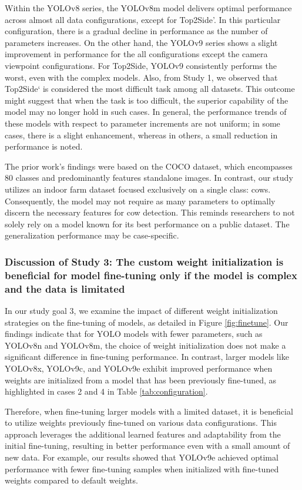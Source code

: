 Within the YOLOv8 series, the YOLOv8m model delivers optimal performance across almost all data configurations, except for Top2Side'. In this particular configuration, there is a gradual decline in performance as the number of parameters increases. On the other hand, the YOLOv9 series shows a slight improvement in performance for the all configurations except the camera viewpoint configurations. For Top2Side, YOLOv9 consistently performs the worst, even with the complex models. Also, from Study 1, we observed that Top2Side` is considered the most difficult task among all datasets. This outcome might suggest that when the task is too difficult, the superior capability of the model may no longer hold in such cases. In general, the performance trends of these models with respect to parameter increments are not uniform; in some cases, there is a slight enhancement, whereas in others, a small reduction in performance is noted.

The prior work's findings were based on the COCO dataset, which encompasses 80 classes and predominantly features standalone images. In contrast, our study utilizes an indoor farm dataset focused exclusively on a single class: cows. Consequently, the model may not require as many parameters to optimally discern the necessary features for cow detection. This reminds researchers to not solely rely on a model known for its best performance on a public dataset. The generalization performance may be case-specific.


\subsubsection*{Discussion of Study 3: The custom weight initialization is beneficial for model fine-tuning only if the  model is complex and the data is limitated}

In our study goal 3, we examine the impact of different weight initialization strategies on the fine-tuning of models, as detailed in Figure \ref{fig:finetune}. Our findings indicate that for YOLO models with fewer parameters, such as YOLOv8n and YOLOv8m, the choice of weight initialization does not make a significant difference in fine-tuning performance. In contrast, larger models like YOLOv8x, YOLOv9c, and YOLOv9e exhibit improved performance when weights are initialized from a model that has been previously fine-tuned, as highlighted in cases 2 and 4 in Table \ref{tab:configuration}.

Therefore, when fine-tuning larger models with a limited dataset, it is beneficial to utilize weights previously fine-tuned on various data configurations. This approach leverages the additional learned features and adaptability from the initial fine-tuning, resulting in better performance even with a small amount of new data. For example, our results showed that YOLOv9e achieved optimal performance with fewer fine-tuning samples when initialized with fine-tuned weights compared to default weights.

